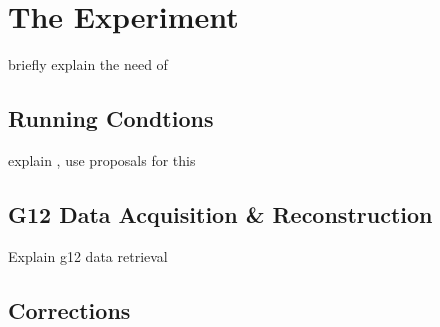 \section{The  Experiment}\label{sec:clas.g12}

briefly explain the need of 

\subsection{ Running Condtions}\label{sec:clas.g12.conditions}

explain , use proposals for this

\subsection{G12 Data Acquisition \& Reconstruction }\label{sec:clas.g12.conditions.data}

Explain g12 data retrieval

\subsection{ Corrections}\label{sec:clas.g12.corrections}

